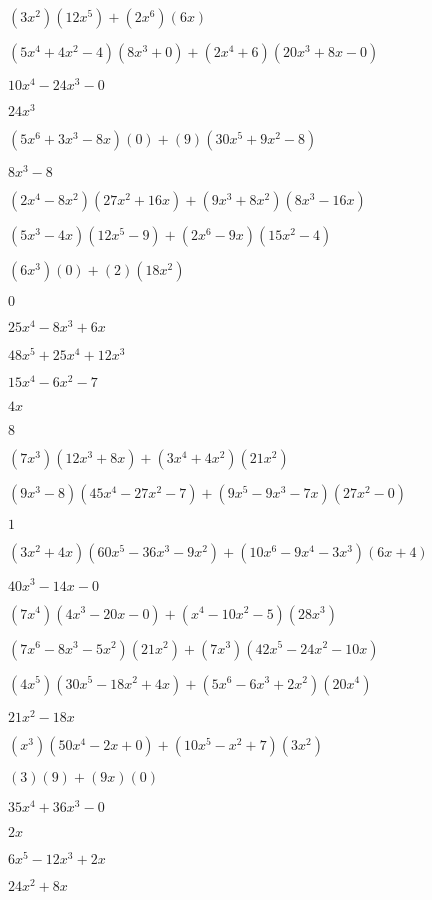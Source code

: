 \documentclass{article}
\begin{document}
\begin{multicols}{2}
$(3x^2)(12x^{5})+(2x^{6})(6x)$\item $(5x^{4}+4x^2-4)(8x^{3}+0)+(2x^{4}+6)(20x^{3}+8x-0)$\item $10x^{4}-24x^{3}-0$\item $24x^{3}$\item $(5x^{6}+3x^{3}-8x)(0)+(9)(30x^{5}+9x^{2}-8)$\item $8x^{3}-8$\item $(2x^{4}-8x^2)(27x^{2}+16x)+(9x^{3}+8x^2)(8x^{3}-16x)$\item $(5x^{3}-4x)(12x^{5}-9)+(2x^{6}-9x)(15x^{2}-4)$\item $(6x^{3})(0)+(2)(18x^{2})$\item $0$\item $25x^{4}-8x^{3}+6x$\item $48x^{5}+25x^{4}+12x^{3}$\item $15x^{4}-6x^{2}-7$\item $4x$\item $8$\item $(7x^{3})(12x^{3}+8x)+(3x^{4}+4x^2)(21x^{2})$\item $(9x^{3}-8)(45x^{4}-27x^{2}-7)+(9x^{5}-9x^{3}-7x)(27x^{2}-0)$\item $1$\item $(3x^2+4x)(60x^{5}-36x^{3}-9x^{2})+(10x^{6}-9x^{4}-3x^{3})(6x+4)$\item $40x^{3}-14x-0$\item $(7x^{4})(4x^{3}-20x-0)+(x^{4}-10x^2-5)(28x^{3})$\item $(7x^{6}-8x^{3}-5x^2)(21x^{2})+(7x^{3})(42x^{5}-24x^{2}-10x)$\item $(4x^{5})(30x^{5}-18x^{2}+4x)+(5x^{6}-6x^{3}+2x^2)(20x^{4})$\item $21x^{2}-18x$\item $(x^{3})(50x^{4}-2x+0)+(10x^{5}-x^2+7)(3x^{2})$\item $(3)(9)+(9x)(0)$\item $35x^{4}+36x^{3}-0$\item $2x$\item $6x^{5}-12x^{3}+2x$\item $24x^{2}+8x$\item 
\end{multicols}
\end{document}

